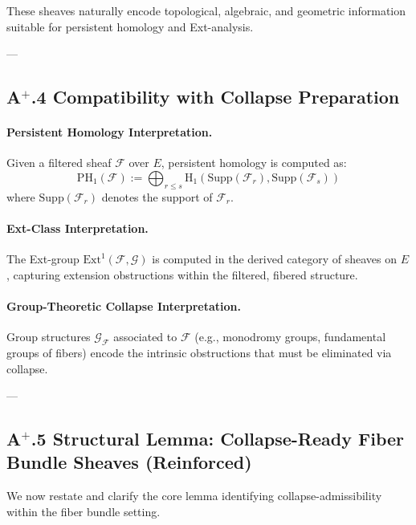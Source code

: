 \documentclass[11pt]{article}
\begin{document}
These sheaves naturally encode topological, algebraic, and geometric information suitable for persistent homology and Ext-analysis.

---

\subsection*{A$^{+}$.4 Compatibility with Collapse Preparation}

\paragraph{Persistent Homology Interpretation.}

Given a filtered sheaf $\mathcal{F}$ over $E$, persistent homology is computed as:
\[
\mathrm{PH}_1(\mathcal{F}) := \bigoplus_{r \leq s} \mathrm{H}_1\left( \mathrm{Supp}(\mathcal{F}_r), \mathrm{Supp}(\mathcal{F}_s) \right)
\]
where $\mathrm{Supp}(\mathcal{F}_r)$ denotes the support of $\mathcal{F}_r$.

\paragraph{Ext-Class Interpretation.}

The Ext-group $\mathrm{Ext}^1(\mathcal{F}, \mathcal{G})$ is computed in the derived category of sheaves on $E$, capturing extension obstructions within the filtered, fibered structure.

\paragraph{Group-Theoretic Collapse Interpretation.}

Group structures $\mathcal{G}_{\mathcal{F}}$ associated to $\mathcal{F}$ (e.g., monodromy groups, fundamental groups of fibers) encode the intrinsic obstructions that must be eliminated via collapse.

---

\subsection*{A$^{+}$.5 Structural Lemma: Collapse-Ready Fiber Bundle Sheaves (Reinforced)}

We now restate and clarify the core lemma identifying collapse-admissibility within the fiber bundle setting.
\end{document}
